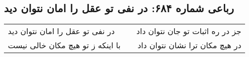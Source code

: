 \begin{center}
\section*{رباعی شماره ۶۸۴: در نفی تو عقل را امان نتوان دید}
\label{sec:0684}
\begin{longtable}{l p{0.5cm} r}
در نفی تو عقل را امان نتوان دید
&&
جز در ره اثبات تو جان نتوان داد
\\
با اینکه ز تو هیچ مکان خالی نیست
&&
در هیچ مکان ترا نشان نتوان داد
\\
\end{longtable}
\end{center}
